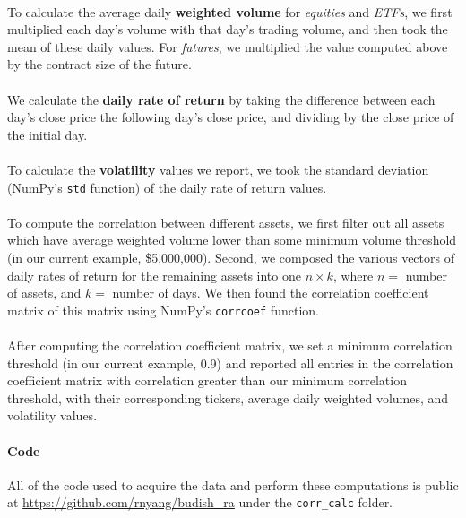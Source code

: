 \documentclass[11pt]{article}
\begin{document}
\paragraph{}
To calculate the average daily \textbf{weighted volume} for \textit{equities} and \textit{ETFs}, we first multiplied each day's volume with that day's trading volume, and then took the mean of these daily values. For \textit{futures}, we multiplied the value computed above by the contract size of the future.

\paragraph{}
We calculate the \textbf{daily rate of return} by taking the difference between each day's close price the following day's close price, and dividing by the close price of the initial day.

\paragraph{}
To calculate the \textbf{volatility} values we report, we took the standard deviation (NumPy's \texttt{std} function) of the daily rate of return values.

\paragraph{}
To compute the correlation between different assets, we first filter out all assets which have average weighted volume lower than some minimum volume threshold (in our current example, \$5,000,000). Second, we composed the various vectors of daily rates of return for the remaining assets into one $n \times k$, where $n = $ number of assets, and $k = $ number of days. We then found the correlation coefficient matrix of this matrix using NumPy's \texttt{corrcoef} function.

\paragraph{}
After computing the correlation coefficient matrix, we set a minimum correlation threshold (in our current example, 0.9) and reported all entries in the correlation coefficient matrix with correlation greater than our minimum correlation threshold, with their corresponding tickers, average daily weighted volumes, and volatility values.

\paragraph{Code} All of the code used to acquire the data and perform these computations is public at \url{https://github.com/rnyang/budish_ra} under the \texttt{corr\_calc} folder.
\end{document}
